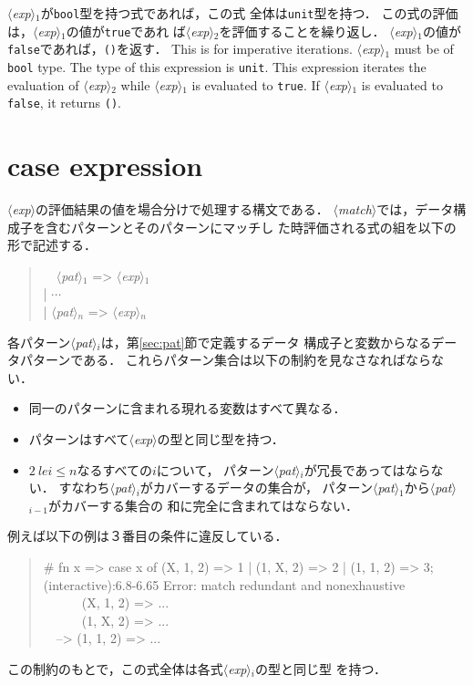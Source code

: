 \documentclass{jbook}
\newcommand{\txt}[2]{#2}
\newcommand{\code}[1]{\mbox{\large\tt #1}}
\newcommand{\nonterm}[1]{\mbox{$\langle$}{\it #1}\mbox{$\rangle$}}
\newcommand{\myem}{\mbox{\ \ }}
\newenvironment{program}{\begin{quote}\begin{tt}}%
                        {\end{tt}\end{quote}}
\begin{document}
\ifjp%
	\nonterm{exp}$_1$が\code{bool}型を持つ式であれば，この式
全体は\code{unit}型を持つ．
	この式の評価は，\nonterm{exp}$_1$の値が\code{true}であれ
ば\nonterm{exp}$_2$を評価することを繰り返し．
	\nonterm{exp}$_1$の値が\code{false}であれば，\code{()}を返す．
\else%
	This is for imperative iterations.
	\nonterm{exp}$_1$ must be of \code{bool} type.
	The type of this expression is \code{unit}.
	This expression iterates the evaluation of \nonterm{exp}$_2$
while \nonterm{exp}$_1$ is evaluated to \code{true}.
	If \nonterm{exp}$_1$ is evaluated to \code{false}, it
returns \code{()}.
\fi%

\section{\txt{場合分け構文}{case expression}}
\label{sec:patternMatching}

\ifjp%
	\nonterm{exp}の評価結果の値を場合分けで処理する構文である．
	\nonterm{match}では，データ構成子を含むパターンとそのパターンにマッチし
た時評価される式の組を以下の形で記述する．
\begin{program}
\myem  \nonterm{pat}$_1$ => \nonterm{exp}$_1$
\\
| $\cdots$
\\
| \nonterm{pat}$_n$ => \nonterm{exp}$_n$
\end{program}
	各パターン\nonterm{pat}$_i$は，第\ref{sec:pat}節で定義するデータ
構成子と変数からなるデータパターンである．
	これらパターン集合は以下の制約を見なさなればならない．
\begin{itemize}
\item 同一のパターンに含まれる現れる変数はすべて異なる．
\item パターンはすべて\nonterm{exp}の型と同じ型を持つ．
\item $2\ le i \le n$なるすべての$i$について，
パターン\nonterm{pat}$_i$が冗長であってはならない．
	すなわち\nonterm{pat}$_i$がカバーするデータの集合が，
パターン\nonterm{pat}$_1$から\nonterm{pat}$_{i-1}$がカバーする集合の
和に完全に含まれてはならない．
\end{itemize}
	例えば以下の例は３番目の条件に違反している．
\begin{program}
\# fn x => case x of (X, 1, 2) => 1 | (1, X, 2) => 2 | (1, 1, 2) => 3;
\\
(interactive):6.8-6.65 Error: match redundant and nonexhaustive
\\
\myem\myem\myem  (X, 1, 2) => ...
\\
\myem\myem\myem  (1, X, 2) => ...
\\
\myem --> (1, 1, 2) => ...
\end{program}
	この制約のもとで，この式全体は各式\nonterm{exp}$_i$の型と同じ型
を持つ．
\end{document}
